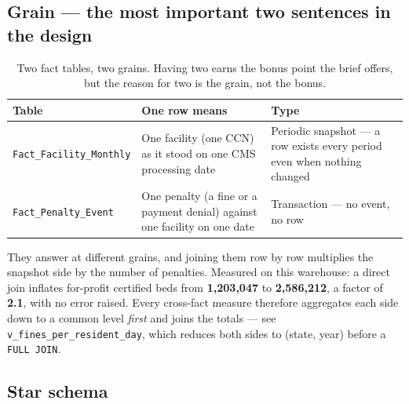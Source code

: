\documentclass[11pt,a4paper]{article}
\newcommand{\sansall}{\sffamily}
\newcommand{\code}[1]{\texttt{#1}}
\begin{document}
\subsection{Grain — the most important two sentences in the design}

\begin{table}[htbp]\centering\small
\begin{tabular}{L{4.4cm} L{7.0cm} L{3.6cm}}
\toprule
\sansall\bfseries Table & \sansall\bfseries One row means &
\sansall\bfseries Type \\
\midrule
\code{Fact\_Facility\_Monthly} & One facility (one CCN) as it stood on one CMS
  processing date & Periodic snapshot — a row exists every period even when
  nothing changed \\
\addlinespace
\code{Fact\_Penalty\_Event} & One penalty (a fine or a payment denial) against
  one facility on one date & Transaction — no event, no row \\
\bottomrule
\end{tabular}
\caption{Two fact tables, two grains. Having two earns the bonus point the
brief offers, but the reason for two is the grain, not the bonus.}
\end{table}

\begin{keybox}[title={Why these two facts must not be merged}]
They answer at different grains, and joining them row by row multiplies the
snapshot side by the number of penalties. Measured on this warehouse: a direct
join inflates for-profit certified beds from \textbf{1{,}203{,}047} to
\textbf{2{,}586{,}212}, a factor of \textbf{2.1}, with no error raised. Every
cross-fact measure therefore aggregates each side down to a common level
\emph{first} and joins the totals — see \code{v\_fines\_per\_resident\_day},
which reduces both sides to (state, year) before a \code{FULL JOIN}.
\end{keybox}

\subsection{Star schema}
\end{document}
